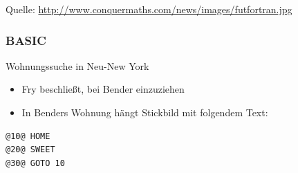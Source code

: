 \begin{frame}
\begin{figure}[ht]
	\centering
\end{figure}
\scriptsize{Quelle: \href{http://www.conquermaths.com/news/images/futfortran.jpg}{\url{http://www.conquermaths.com/news/images/futfortran.jpg}}}
\end{frame}

\subsubsection{BASIC}

\begin{frame}[fragile]
\begin{block}{Wohnungssuche in Neu-New York}
\begin{itemize}
	\item Fry beschließt, bei Bender einzuziehen
	\item In Benders Wohnung hängt Stickbild mit folgendem Text:
\end{itemize}
\begin{lstlisting}[style=base]
@10@ HOME
@20@ SWEET
@30@ GOTO 10
\end{lstlisting}
\end{block}
\end{frame}

